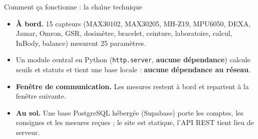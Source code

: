 \documentclass[aspectratio=169,11pt]{beamer}
\begin{document}
\begin{frame}{Comment \c{c}a fonctionne : la cha\^{\i}ne technique}
\begin{center}
\end{center}
\vspace{0.08cm}
\begin{itemize}
  \item \textbf{\`A bord.} 15 capteurs (MAX30102, MAX30205, MH-Z19, MPU6050, DEXA, Jamar, Omron, GSR, dosim\`etre, bracelet, ceinture, laboratoire, calcul, InBody, balance) mesurent 25 param\`etres.
  \item Un module central en Python (\texttt{http.server}, \textbf{aucune d\'ependance}) calcule seuils et statuts et tient une base locale : \textbf{aucune d\'ependance au r\'eseau}.
  \item \textbf{Fen\^etre de communication.} Les mesures restent \`a bord et repartent \`a la fen\^etre suivante.
  \item \textbf{Au sol.} Une base PostgreSQL h\'eberg\'ee (Supabase) porte les comptes, les consignes et les mesures re\c{c}ues ; le site est statique, l'API REST tient lieu de serveur.
\end{itemize}
\end{frame}
\end{document}

